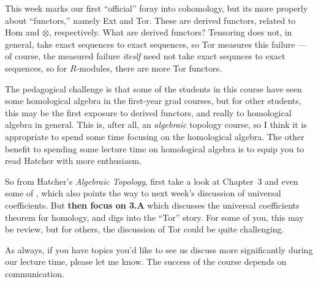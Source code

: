 \documentclass{homework}
\author{Jim Fowler}
\date{Week 4: Functors}
\begin{document}
\maketitle

This week marks our first ``official'' foray into cohomology, but its
more properly about ``functors,'' namely Ext and Tor.  These are
derived functors, related to Hom and $\otimes$, respectively.  What
are derived functors?  Tensoring does not, in general, take exact
sequences to exact sequences, so Tor measures this failure --- of
course, the measured failure \textit{iteslf} need not take exact
sequnces to exact sequences, so for $R$-modules, there are more Tor
functors.

The pedagogical challenge is that some of the students in this course
have seen some homological algebra in the first-year grad courses, but
for other students, this may be the first exposure to derived
functors, and really to homological algebra in general.  This is,
after all, an \textit{algebraic} topology course, so I think it is
appropriate to spend some time focusing on the homological algebra.
The other benefit to spending some lecture time on homological algebra
is to equip you to read Hatcher with more enthusiasm.

So from Hatcher's \textit{Algebraic Topology}, first take a look at
Chapter~3 and even some of , which also points the way
to next week's discussion of universal coefficients.  But \textbf{then
focus on \textsection 3.A} which discusses the universal coefficients
theorem for homology, and digs into the ``Tor'' story.  For some of
you, this may be review, but for others, the discussion of Tor could
be quite challenging.

As always, if you have topics you'd like to see us discuss more
significantly during our lecture time, please let me know.  The
success of the course depends on communication.
\end{document}
